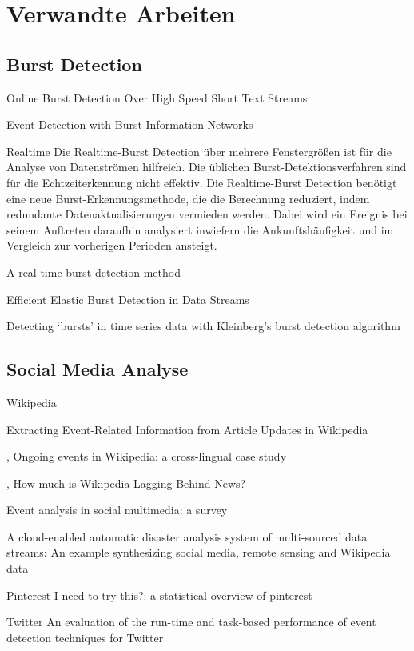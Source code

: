 \section{Verwandte Arbeiten}
\subsection{Burst Detection}

Online Burst Detection Over High Speed Short Text Streams
\cite{yuan2007online}


Event Detection with Burst Information Networks
\cite{ge2016event}

Realtime
Die Realtime-Burst Detection über mehrere Fenstergrößen ist für die Analyse von Datenströmen hilfreich. Die üblichen Burst-Detektionsverfahren sind für die Echtzeiterkennung nicht effektiv. Die Realtime-Burst Detection benötigt eine neue Burst-Erkennungsmethode, die die Berechnung reduziert, indem redundante Datenaktualisierungen vermieden werden. Dabei wird ein Ereignis bei seinem Auftreten daraufhin analysiert inwiefern die Ankunftshäufigkeit und im Vergleich zur vorherigen Perioden ansteigt.

\cite{ebina2011real}
A real-time burst detection method

Efficient Elastic Burst Detection in Data Streams 
\cite{Zhu:2003:EEB:956750.956789}

Detecting ‘bursts’ in time series data with Kleinberg’s burst detection algorithm
\cite{kleinberg1}

\subsection{Social Media Analyse}

Wikipedia

Extracting Event-Related Information from
Article Updates in Wikipedia
\cite{10.1007978-3-642-36973-5_22}


\cite{gottschalk2017ongoing},
  Ongoing events in Wikipedia: a cross-lingual case study

\cite{fetahu2015much},
  How much is Wikipedia Lagging Behind News?

\cite{liu2016event}
  Event analysis in social multimedia: a survey

A cloud-enabled automatic disaster analysis system of multi-sourced data streams: An example synthesizing social media, remote sensing and Wikipedia data
\cite{huang2017cloud}

Pinterest
I need to try this?: a statistical overview of pinterest
\cite{gilbert2013need}

Twitter
An evaluation of the run-time and task-based performance of event detection techniques for Twitter
\cite{weiler2016evaluation}
